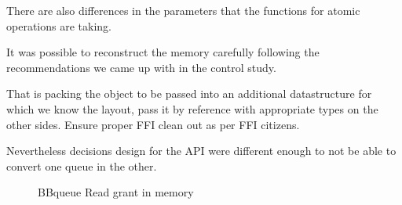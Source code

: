 \documentclass[nomenclature, english, bibtex]{kththesis}
\begin{document}
There are also differences in the parameters that the functions for atomic operations are taking.

It was possible to reconstruct the memory carefully following the recommendations we came up with in the control study. 

That is packing the object to be passed into an additional datastructure for which we know the layout, pass it by reference with appropriate types on the other sides. Ensure proper FFI clean out as per FFI citizens.



Nevertheless decisions design for the API were different enough to not be able to convert one queue in the other.

\begin{figure}
    \centering
    \begin{minipage}{.45\textwidth}
        \label{fig:hiddenbufferheader}
    \end{minipage}
        \begin{minipage}{.45\textwidth}
    \end{minipage}
    \caption{BBqueue Read grant in memory}
    \label{fig:memBBqueue}
\end{figure}
\end{document}
